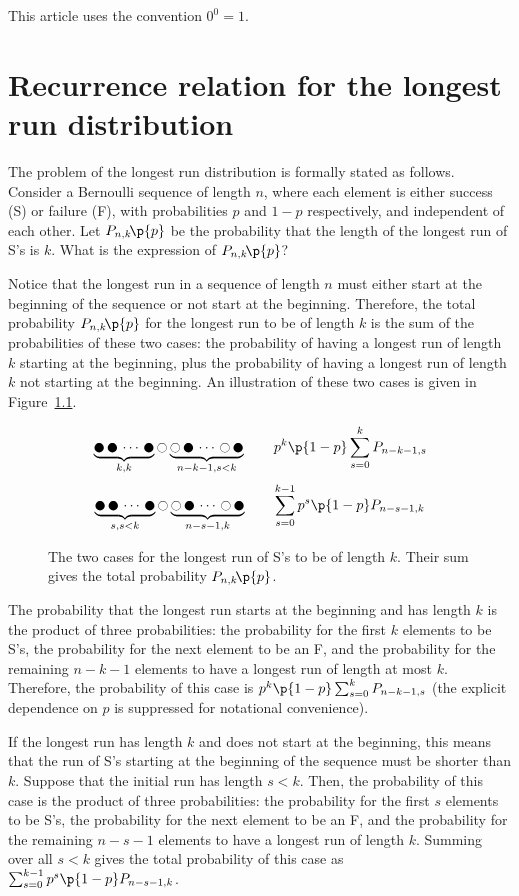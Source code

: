 \documentclass[oneside,12pt,final]{ucthesis-CA2012}
\newcommand{\fc}[2]{#1\mathchoice{\!}{\!}{}{}\p{#2}} %
\begin{document}
\begin{mainmatter}
This article uses the convention $0^0=1$.

\chapter{Recurrence relation for the longest run distribution}
\label{sec:recurrence}

The problem of the longest run distribution is formally stated as follows.
Consider a Bernoulli sequence of length $n$,
where each element is either success (S) or failure (F),
with probabilities $p$ and $1-p$ respectively, and independent of each other.
Let $\fc{P_{n,k}}{p}$ be the probability that the length of the longest run of S's is $k$.
What is the expression of $\fc{P_{n,k}}{p}$?

Notice that the longest run in a sequence of length $n$ must either start at the beginning of the sequence
or not start at the beginning.
Therefore, the total probability $\fc{P_{n,k}}{p}$ for the longest run to be of length $k$
is the sum of the probabilities of these two cases:
the probability of having a longest run of length $k$ starting at the beginning,
plus the probability of having a longest run of length $k$ not starting at the beginning.
An illustration of these two cases is given in Figure~\ref{fig:recurrence cases}.

\begin{figure}[h!]
	\[\underbrace{\newmoon\,\newmoon\,\cdots\,\newmoon}_{k,k}
	\fullmoon
	\underbrace{\fullmoon\,\newmoon\,\cdots\,\fullmoon\,\newmoon}_{n-k-1,s<k}
	\qquad p^k\p{1-p}\sum_{s=0}^{k}P_{n-k-1,s}\]
	\[\underbrace{\newmoon\,\newmoon\,\cdots\,\newmoon}_{s,s<k}
	\fullmoon
	\underbrace{\fullmoon\,\newmoon\,\cdots\,\fullmoon\,\newmoon}_{n-s-1,k}
	\qquad \sum_{s=0}^{k-1}p^s\p{1-p}P_{n-s-1,k}\]
	\caption{The two cases for the longest run of S's to be of length $k$.
	Their sum gives the total probability $\fc{P_{n,k}}{p}$.}
	\label{fig:recurrence cases}
\end{figure}

The probability that the longest run starts at the beginning and has length $k$
is the product of three probabilities:
the probability for the first $k$ elements to be S's,
the probability for the next element to be an F,
and the probability for the remaining $n-k-1$ elements
to have a longest run of length at most $k$.
Therefore, the probability of this case is $p^k\p{1-p}\sum_{s=0}^{k}P_{n-k-1,s}$
(the explicit dependence on $p$ is suppressed for notational convenience).

If the longest run has length $k$ and does not start at the beginning,
this means that the run of S's starting at the beginning of the sequence
must be shorter than $k$.
Suppose that the initial run has length $s<k$.
Then, the probability of this case is the product of three probabilities:
the probability for the first $s$ elements to be S's,
the probability for the next element to be an F,
and the probability for the remaining $n-s-1$ elements
to have a longest run of length $k$.
Summing over all $s<k$ gives the total probability of this case as
$\sum_{s=0}^{k-1}p^s\p{1-p}P_{n-s-1,k}$.


\end{mainmatter}
\end{document}
